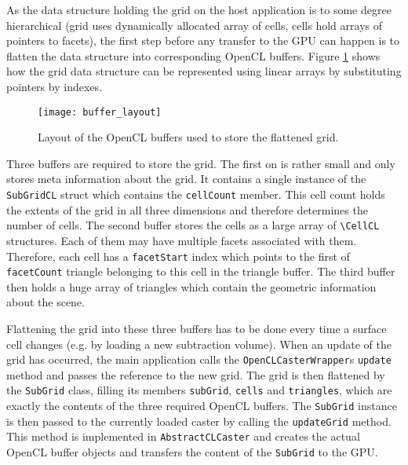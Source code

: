 As the data structure holding the grid on the host application is to some degree hierarchical (grid uses dynamically allocated array of cells, cells hold arrays of pointers to facets), the first step before any transfer to the GPU can happen is to flatten the data structure into corresponding OpenCL buffers. Figure \ref{fig:buffer_layout} shows how the grid data structure can be represented using linear arrays by substituting pointers by indexes.

\begin{figure}
\centering
\texttt{[image: buffer\_layout]}
\caption{Layout of the OpenCL buffers used to store the flattened grid.}
\label{fig:buffer_layout}
\end{figure}

Three buffers are required to store the grid. The first on is rather small and only stores meta information about the grid. It contains a single instance of the \lstinline!SubGridCL! struct which contains the \lstinline!cellCount! member. This cell count holds the extents of the grid in all three dimensions and therefore determines the number of cells.
The second buffer stores the cells as a large array of \lstinline!\CellCL! structures. Each of them may have multiple facets associated with them. Therefore, each cell has a \lstinline!facetStart! index which points to the first of \lstinline!facetCount! triangle belonging to this cell in the triangle buffer.
The third buffer then holds a huge array of triangles which contain the geometric information about the scene.

Flattening the grid into these three buffers has to be done every time a surface cell changes (e.g. by loading a new subtraction volume). When an update of the grid has occurred, the main application calls the \lstinline!OpenCLCasterWrapper!s \lstinline!update! method and passes the reference to the new grid. The grid is then flattened by the \lstinline!SubGrid! class, filling its members \lstinline!subGrid!, \lstinline!cells! and \lstinline!triangles!, which are exactly the contents of the three required OpenCL buffers. The \lstinline!SubGrid! instance is then passed to the currently loaded caster by calling the \lstinline!updateGrid! method. This method is implemented in \lstinline!AbstractCLCaster! and creates the actual OpenCL buffer objects and transfers the content of the \lstinline!SubGrid! to the GPU.

